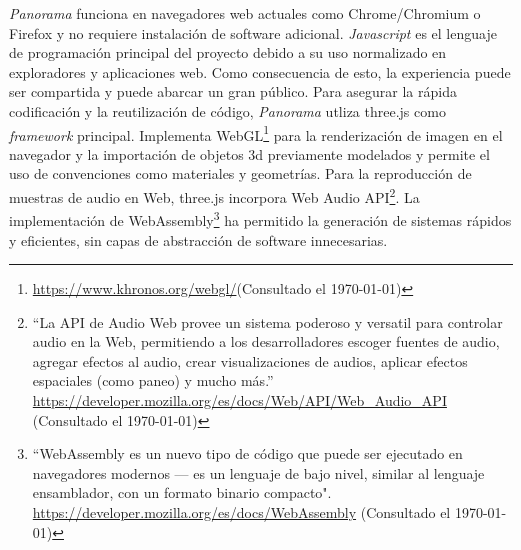 
\textit{Panorama} funciona en navegadores web actuales como Chrome/Chromium o Firefox y no requiere instalación de software adicional. \textit{Javascript} es el lenguaje de programación principal del proyecto debido a su uso normalizado en exploradores y aplicaciones web. Como consecuencia de esto, la experiencia puede ser compartida y puede abarcar un gran público. Para asegurar la rápida codificación y la reutilización de código, \textit{Panorama} utliza three.js como \textit{framework} principal. Implementa WebGL\footnote{\url{https://www.khronos.org/webgl/}(Consultado el \today)} para la renderización de imagen en el navegador y la importación de objetos 3d previamente modelados y permite el uso de convenciones como materiales y geometrías. Para la reproducción de muestras de audio en Web, three.js incorpora Web Audio API\footnote{``La API de Audio Web provee un sistema poderoso y versatil para controlar audio en la Web, permitiendo a los desarrolladores escoger fuentes de audio, agregar efectos al audio, crear visualizaciones de audios, aplicar efectos espaciales (como paneo) y mucho más.'' \url{https://developer.mozilla.org/es/docs/Web/API/Web_Audio_API} (Consultado el \today)}. La implementación de WebAssembly\footnote{``WebAssembly es un nuevo tipo de código que puede ser ejecutado en navegadores modernos — es un lenguaje de bajo nivel, similar al lenguaje ensamblador, con un formato binario compacto". \url{https://developer.mozilla.org/es/docs/WebAssembly} (Consultado el \today) } ha permitido la generación de sistemas rápidos y eficientes, sin capas de abstracción de software innecesarias. %


  
